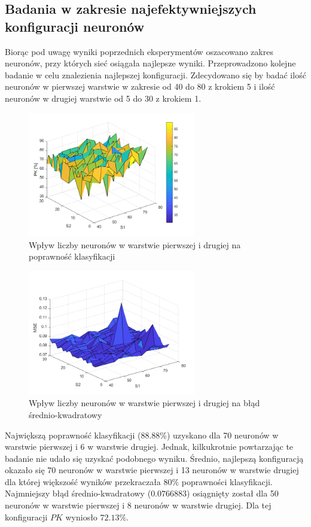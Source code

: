 \subsection{Badania w zakresie najefektywniejszych konfiguracji neuronów}
Biorąc pod uwagę wyniki poprzednich eksperymentów oszacowano zakres neuronów, przy których sieć osiągała najlepsze wyniki. Przeprowadzono kolejne badanie w celu znalezienia najlepszej konfiguracji. Zdecydowano się by badać ilość neuronów w pierwszej warstwie w zakresie od 40 do 80 z krokiem 5 i ilość neuronów w drugiej warstwie od 5 do 30 z krokiem 1.
\begin{figure}[!h]
\centering
\includegraphics[width = 0.65\textwidth]{Grafika/pk4.png}
\caption{Wpływ liczby neuronów w warstwie pierwszej i drugiej na poprawność klasyfikacji}
\label{fig:PKeksperyment4}
\end{figure}
\begin{figure}[!h]
\centering
\includegraphics[width = 0.65\textwidth]{Grafika/MSE4.png}
\caption{Wpływ liczby neuronów w warstwie pierwszej i drugiej na błąd średnio-kwadratowy}
\label{fig:MSEeksperyment4}
\end{figure}

Największą poprawność klasyfikacji ($88.88\%$) uzyskano dla 70 neuronów w warstwie pierwszej i 6 w warstwie drugiej. Jednak, kilkukrotnie powtarzając te badanie nie udało się uzyskać podobnego wyniku. Średnio, najlepszą konfiguracją okazało się 70 neuronów w warstwie pierwszej i 13 neuronów w warstwie drugiej dla której większość wyników przekraczała $80\%$ poprawności klasyfikacji.\\
Najmniejszy błąd średnio-kwadratowy ($0.0766883$) osiągnięty został dla 50 neuronów w warstwie pierwszej i 8 neuronów w warstwie drugiej. Dla tej konfiguracji $PK$ wyniosło $72.13\%$.\\